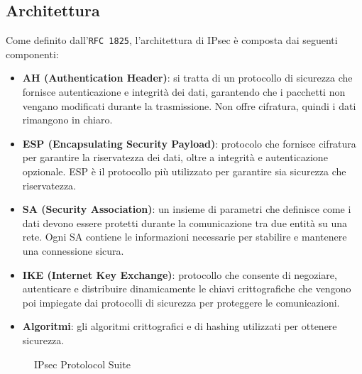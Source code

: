 \subsection{Architettura}

Come definito dall'\texttt{RFC 1825}, l'architettura di IPsec è composta dai seguenti componenti:

\begin{itemize}
    \item \textbf{AH (Authentication Header)}: si tratta di un protocollo di sicurezza che fornisce autenticazione e integrità dei dati,
    garantendo che i pacchetti non vengano modificati durante la trasmissione. Non offre cifratura, quindi i dati rimangono in chiaro. 
    \item \textbf{ESP (Encapsulating Security Payload)}: protocolo che fornisce cifratura per garantire la riservatezza dei dati,
    oltre a integrità e autenticazione opzionale. ESP è il protocollo più utilizzato
    per garantire sia sicurezza che riservatezza.
    
    \item \textbf{SA (Security Association)}: un insieme di parametri che definisce come i dati devono essere protetti durante la comunicazione tra due entità su una rete. Ogni SA contiene le informazioni necessarie per stabilire e mantenere una connessione sicura.
    \item \textbf{IKE (Internet Key Exchange)}: protocollo che consente di negoziare, autenticare e distribuire dinamicamente le chiavi crittografiche che vengono poi impiegate dai protocolli di sicurezza per proteggere le comunicazioni.
    \item \textbf{Algoritmi}: gli algoritmi crittografici e di hashing utilizzati per ottenere sicurezza.
\end{itemize}

\begin{figure}[!ht] 
    \centering 
    \caption{IPsec Protolocol Suite}
    \label{fig:ipsec-suite} 
\end{figure}
    


